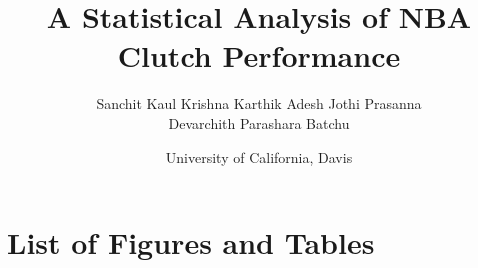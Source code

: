 \documentclass[12pt]{article}
\begin{document}
\title{\textbf{A Statistical Analysis of NBA Clutch Performance}}

\author{
    Sanchit Kaul \quad Krishna Karthik \quad Adesh Jothi Prasanna \\[4pt]
    Devarchith Parashara Batchu
}

\date{University of California, Davis}

\maketitle
\thispagestyle{plain}



\begin{abstract}

\end{abstract}







\nocite{*}


\newpage
\section{List of Figures and Tables}
\end{document}
